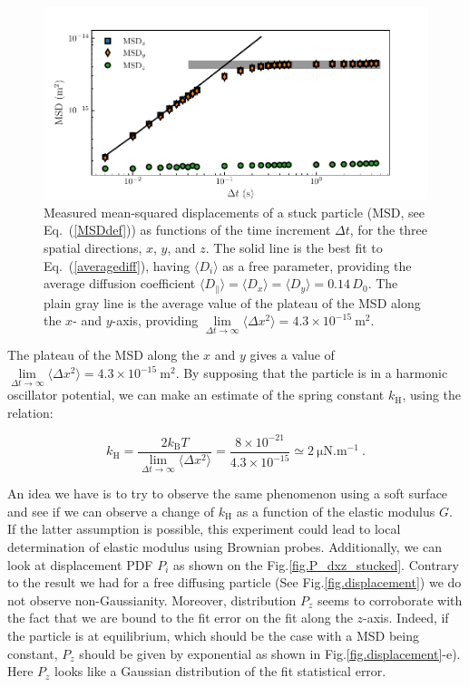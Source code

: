 \begin{figure}[H]
	\centering
	\includegraphics{02_body/chapter4/images/stucked_particle/MSD_stucked.pdf}
	\caption{Measured mean-squared displacements of a stuck particle (MSD, see Eq.~(\ref{MSDdef})) as functions of the time increment $\Delta t$, for the three spatial directions, $x$, $y$, and $z$. The solid line is the best fit to Eq.~(\ref{averagediff}), having $\langle D_i \rangle$ as a free parameter,
		providing the average diffusion coefficient $\langle{D_\parallel}\rangle= \langle D_x\rangle=\langle D_y \rangle =0.14\,D_0$. The plain gray line is the average value of the plateau of the MSD along the $x$- and $y$-axis, providing $ \lim\limits_{\Delta t \rightarrow \infty }\langle \Delta x ^2 \rangle = 4.3 \times 10 ^{-15} ~ \mathrm{m^2}$.}
	\label{fig.MSD_stucked}
\end{figure}

The plateau of the MSD along the $x$ and $y$ gives a value of  $ \lim\limits_{\Delta t \rightarrow \infty }\langle \Delta x ^2 \rangle = 4.3 \times 10 ^{-15} ~ \mathrm{m^2}$. By supposing that the particle is in a harmonic oscillator potential, we can make an estimate of the spring constant $k_\mathrm{H}$, using the relation:

\begin{equation}
	k_\mathrm{H} = \frac{ 2 k_\mathrm{B} T}{ \lim\limits_{\Delta t \rightarrow \infty }\langle \Delta x ^2 \rangle} = \frac{8 \times 10^{-21}}{4.3 \times 10 ^{-15}} \simeq 2 ~ \mathrm{\mu N . m^{-1}}~.
\end{equation}

An idea we have is to try to observe the same phenomenon using a soft surface and see if we can observe a change of $k_\mathrm{H}$ as a function of the elastic modulus $G$. If the latter assumption is possible, this experiment could lead to local determination of elastic modulus using Brownian probes. Additionally, we can look at displacement \gls{PDF} $P_i$ as shown on the Fig.\ref{fig.P_dxz_stucked}. Contrary to the result we had for a free diffusing particle (See Fig.\ref{fig.displacement}) we do not observe non-Gaussianity. Moreover, distribution $P_z$ seems to corroborate with the fact that we are bound to the fit error on the fit along the $z$-axis. Indeed, if the particle is at equilibrium, which should be the case with a MSD being constant, $P_z$ should be given by exponential as shown in Fig.\ref{fig.displacement}-e). Here $P_z$ looks like a Gaussian distribution of the fit statistical error.


